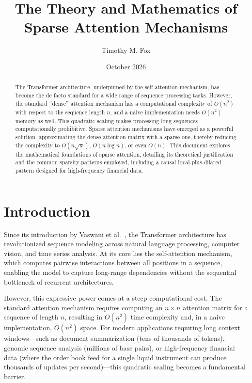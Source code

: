 \documentclass{article}
\title{The Theory and Mathematics of Sparse Attention Mechanisms}
\author{Timothy M. Fox}
\date{October 2026}
\begin{document}
\maketitle

\begin{abstract}
The Transformer architecture, underpinned by the self-attention mechanism, has become the de facto standard for a wide range of sequence processing tasks. However, the standard ``dense'' attention mechanism has a computational complexity of \(O(n^2)\) with respect to the sequence length \(n\), and a naive implementation needs \(O(n^2)\) memory as well. This quadratic scaling makes processing long sequences computationally prohibitive. Sparse attention mechanisms have emerged as a powerful solution, approximating the dense attention matrix with a sparse one, thereby reducing the complexity to \(O(n \sqrt{n})\), \(O(n \log n)\), or even \(O(n)\). This document explores the mathematical foundations of sparse attention, detailing its theoretical justification and the common sparsity patterns employed, including a causal local-plus-dilated pattern designed for high-frequency financial data.
\end{abstract}

\section{Introduction}

Since its introduction by Vaswani et al.~\cite{vaswani2017attention}, the Transformer architecture has revolutionized sequence modeling across natural language processing, computer vision, and time series analysis. At its core lies the self-attention mechanism, which computes pairwise interactions between all positions in a sequence, enabling the model to capture long-range dependencies without the sequential bottleneck of recurrent architectures.

However, this expressive power comes at a steep computational cost. The standard attention mechanism requires computing an \(n \times n\) attention matrix for a sequence of length \(n\), resulting in \(O(n^2)\) time complexity and, in a naive implementation, \(O(n^2)\) space. For modern applications requiring long context windows---such as document summarization (tens of thousands of tokens), genomic sequence analysis (millions of base pairs), or high-frequency financial data (where the order book feed for a single liquid instrument can produce thousands of updates per second)---this quadratic scaling becomes a fundamental barrier.
\end{document}
